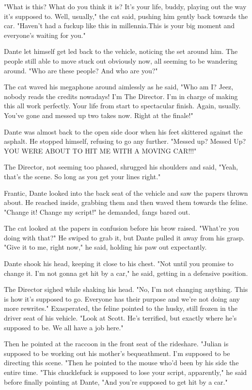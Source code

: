 "What is this? What do you think it is? It's your life, buddy, playing out the way it's supposed to. Well, usually," the cat said, pushing him gently back towards the car. "Haven't had a fuckup like this in millennia.This is your big moment and everyone's waiting for you."

Dante let himself get led back to the vehicle, noticing the set around him. The people still able to move stuck out obviously now, all seeming to be wandering around. "Who are these people? And who are you?"

The cat waved his megaphone around aimlessly as he said, "Who am I? Jeez, nobody reads the credits nowadays! I'm The Director. I'm in charge of making this all work perfectly. Your life from start to spectacular finish. Again, usually. You've gone and messed up two takes now. Right at the finale!"

Dante was almost back to the open side door when his feet skittered against the asphalt. He stopped himself, refusing to go any further. "Messed up? Messed Up? YOU WERE ABOUT TO HIT ME WITH A MOVING CAR!!!"

The Director, not seeming too phased, shrugged his shoulders and said, "Yeah, that's the scene. So long as you get your lines right."

Frantic, Dante looked into the back seat of the vehicle and saw the papers thrown about. He reached inside, grabbing them and then waved them towards the feline. "Change it! Change my script!" he demanded, fangs bared out.

The cat looked at the papers in confusion before his brow raised. "What're you doing with that?" He swiped to grab it, but Dante pulled it away from his grasp. "Give it to me, right now," he said, holding his paw out expectantly.

Dante shook his head, keeping it close to his chest. "Not until you promise to change it. I'm not gonna get hit by a car," he said, getting in a defensive position.

The Director sighed while shaking his head. "No, I'm not changing anything. This is how it's supposed to go. Everyone has their purpose and we're not doing any more rewrites." Exasperated, the feline pointed to the husky, still frozen in the driver seat of his vehicle. "Look at Scott. He's terrified, but exactly where he's supposed to be. We all have a job here."

Then he pointed at the raccoon in the front seat of the rideshare. "Julian is supposed to be working out his mother's bequeathment. I'm supposed to be directing this scene. "Then he pointed to the mouse who'd been by his side the entire time. "This chucklefuck is supposed to lose your script, apparently," he said before finally pointing at Dante, "And you're supposed to get hit by a car."

